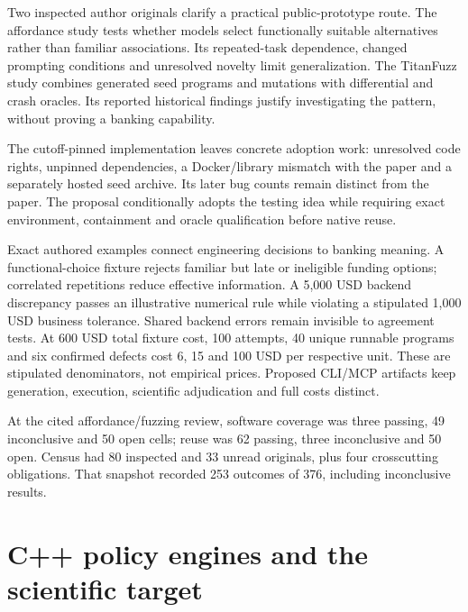 Two inspected author originals clarify a practical public-prototype
route. The affordance study tests whether models select functionally
suitable alternatives rather than familiar associations. Its
repeated-task dependence, changed prompting conditions and unresolved
novelty limit generalization. The TitanFuzz study combines generated
seed programs and mutations with differential and crash oracles. Its
reported historical findings justify investigating the pattern, without
proving a banking capability.
\citep{exec24_affordance_original,exec24_fuzzing_original}

The cutoff-pinned implementation leaves concrete adoption work:
unresolved code rights, unpinned dependencies, a Docker/library mismatch
with the paper and a separately hosted seed archive. Its later bug
counts remain distinct from the paper. The proposal conditionally adopts
the testing idea while requiring exact environment, containment and
oracle qualification before native reuse.
\citep{exec24_titanfuzz_source}

Exact authored examples connect engineering decisions to banking
meaning. A functional-choice fixture rejects familiar but late or
ineligible funding options; correlated repetitions reduce effective
information. A 5,000 USD backend discrepancy passes an illustrative
numerical rule while violating a stipulated 1,000 USD business
tolerance. Shared backend errors remain invisible to agreement tests. At
600 USD total fixture cost, 100 attempts, 40 unique runnable programs
and six confirmed defects cost 6, 15 and 100 USD per respective unit.
These are stipulated denominators, not empirical prices. Proposed
CLI/MCP artifacts keep generation, execution, scientific adjudication
and full costs distinct. \citep{exec24_affordance_fuzzing_reference}

At the cited affordance/fuzzing review, software coverage was three
passing, 49 inconclusive and 50 open cells; reuse was 62 passing, three
inconclusive and 50 open. Census had 80 inspected and 33 unread
originals, plus four crosscutting obligations. That snapshot recorded
253 outcomes of 376, including inconclusive results.
\citep{sp24affordancefuzzing_reader,sp24affordancefuzzing_progress}

\hypertarget{c-policy-engines-and-the-scientific-target}{%
\section{C++ policy engines and the scientific
target}\label{c-policy-engines-and-the-scientific-target}}

